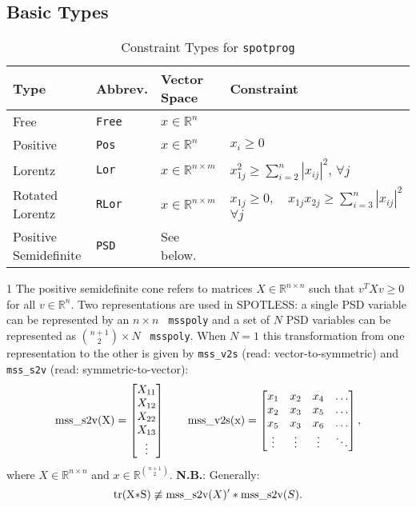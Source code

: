\documentclass{scrartcl}
\newcommand{\RR}{\mathbb{R}}
\newcommand{\trace}{\textrm{tr}}
\newcommand{\spotless}{SPOT{\relsize{-2}LESS}\xspace}
\newcommand{\msspoly}{\lstinline{ msspoly}\xspace}
\newcommand{\spotprog}{\lstinline{spotprog}\xspace}
\begin{document}
\subsection{Basic Types}


\begin{table}
  \centering
  \begin{threeparttable}[b]
  \caption{Constraint Types for \spotprog\label{tab:spotprog_types}}
  \begin{tabular}{|l|lll|}
    \hline
    Type& Abbrev. & Vector Space & Constraint\\
    \hline
    Free & \lstinline!Free! & $ x \in \RR^n$ & \\
    Positive & \lstinline!Pos! & $x\in\RR^n$ & $x_i \geq 0$\\
    Lorentz & \lstinline!Lor! & $x \in\RR^{n\times m}$ & $x_{1j}^2 \geq \sum_{i=2}^n |x_{ij}|^2$, \quad $\forall j$\\
    Rotated Lorentz & \lstinline!RLor! & $x\in\RR^{n\times m}$ & $x_{1j} \geq 0, \quad x_{1j}x_{2j} \geq \sum_{i=3}^n |x_{ij}|^2$\quad $\forall j$\\
    Positive Semidefinite & \lstinline!PSD! & See below.\tnote{1}
&\\
\hline
\end{tabular}
\begin{tablenotes}
\item [1]  The positive semidefinite cone refers to matrices $X \in \RR^{n\times n}$ such that $v^T X v \geq 0$
      for all $v \in \RR^n$.  Two representations are used in \spotless:  a single PSD variable can be represented by an $n\times n$ \msspoly and  a set of $N$ PSD variables can be represented as ${n+1 \choose 2}\times N$ \msspoly.  When $N=1$ this transformation from one representation to the other is given by \lstinline{mss_v2s} (read: vector-to-symmetric) and \lstinline{mss_s2v} (read: symmetric-to-vector):
  \[
  \lstinline{mss_s2v(X)} = \begin{bmatrix} X_{11} \\ X_{12} \\ X_{22} \\ X_{13} \\ \vdots\end{bmatrix}
\qquad   \lstinline{mss_v2s(x)} = \begin{bmatrix}
    x_1 & x_2 & x_4 & \ldots \\
    x_2 & x_3 & x_5 & \ldots \\
    x_5 & x_3 & x_6 & \ldots \\
    \vdots & \vdots & \vdots & \ddots
  \end{bmatrix},
  \]
  where $X \in \RR^{n\times n}$ and $x \in \RR^{n+1 \choose 2}$.
  {\bf N.B.}: Generally:
  \[
 \trace(\lstinline[mathescape]!X*S!) \not \equiv \lstinline{mss_s2v}(X)'*\lstinline{mss_s2v}(S).
 \]
\end{tablenotes}
\end{threeparttable}
\end{table}
\end{document}
